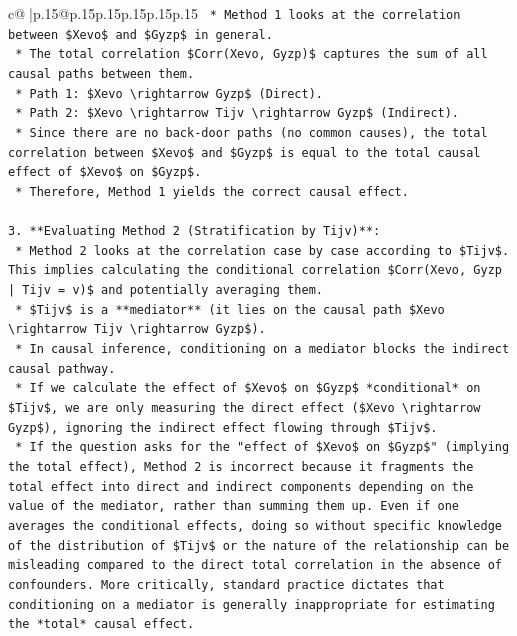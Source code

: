 \documentclass{article}
\begin{document}
{\begin{supertabular}{c@{$\;$}|p{.15\linewidth}@{}p{.15\linewidth}p{.15\linewidth}p{.15\linewidth}p{.15\linewidth}p{.15\linewidth}}
{{{\texttt{    *   Method 1 looks at the correlation between \$Xevo\$ and \$Gyzp\$ in general.} \\
\texttt{    *   The total correlation \$Corr(Xevo, Gyzp)\$ captures the sum of all causal paths between them.} \\
\texttt{    *   Path 1: \$Xevo \textbackslash{}rightarrow Gyzp\$ (Direct).} \\
\texttt{    *   Path 2: \$Xevo \textbackslash{}rightarrow Tijv \textbackslash{}rightarrow Gyzp\$ (Indirect).} \\
\texttt{    *   Since there are no back{-}door paths (no common causes), the total correlation between \$Xevo\$ and \$Gyzp\$ is equal to the total causal effect of \$Xevo\$ on \$Gyzp\$.} \\
\texttt{    *   Therefore, Method 1 yields the correct causal effect.} \\
\\ 
\texttt{3.  **Evaluating Method 2 (Stratification by Tijv)**:} \\
\texttt{    *   Method 2 looks at the correlation case by case according to \$Tijv\$. This implies calculating the conditional correlation \$Corr(Xevo, Gyzp | Tijv = v)\$ and potentially averaging them.} \\
\texttt{    *   \$Tijv\$ is a **mediator** (it lies on the causal path \$Xevo \textbackslash{}rightarrow Tijv \textbackslash{}rightarrow Gyzp\$).} \\
\texttt{    *   In causal inference, conditioning on a mediator blocks the indirect causal pathway.} \\
\texttt{    *   If we calculate the effect of \$Xevo\$ on \$Gyzp\$ *conditional* on \$Tijv\$, we are only measuring the direct effect (\$Xevo \textbackslash{}rightarrow Gyzp\$), ignoring the indirect effect flowing through \$Tijv\$.} \\
\texttt{    *   If the question asks for the "effect of \$Xevo\$ on \$Gyzp\$" (implying the total effect), Method 2 is incorrect because it fragments the total effect into direct and indirect components depending on the value of the mediator, rather than summing them up. Even if one averages the conditional effects, doing so without specific knowledge of the distribution of \$Tijv\$ or the nature of the relationship can be misleading compared to the direct total correlation in the absence of confounders. More critically, standard practice dictates that conditioning on a mediator is generally inappropriate for estimating the *total* causal effect.} \\
}}}
\end{supertabular}}
\end{document}
